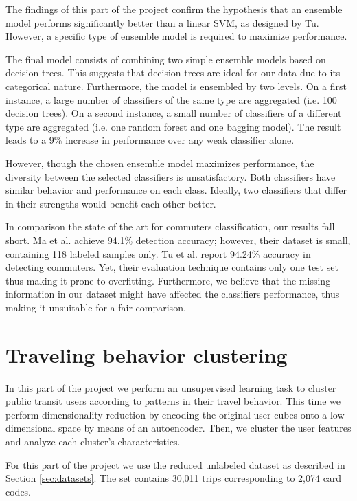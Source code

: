 \documentclass{article}
\begin{document}
The findings of this part of the project confirm the hypothesis that an ensemble model performs significantly better than a linear SVM, as designed by Tu. However, a specific type of ensemble model is required to maximize performance. 

The final model consists of combining two simple ensemble models based on decision trees. This suggests that decision trees are ideal for our data due to its categorical nature. Furthermore, the model is ensembled by two levels. On a first instance, a large number of classifiers of the same type are aggregated (i.e. 100 decision trees). On a second instance, a small number of classifiers of a different type are aggregated (i.e. one random forest and one bagging model). The result leads to a 9\% increase in performance over any weak classifier alone.  

However, though the chosen ensemble model maximizes performance, the diversity between the selected classifiers is unsatisfactory. Both classifiers have similar behavior and performance on each class. Ideally, two classifiers that differ in their strengths would benefit each other better. 


In comparison the state of the art for commuters classification, our results fall short. Ma et al. \cite{ma2017understanding} achieve 94.1\% detection accuracy; however, their dataset is small, containing 118 labeled samples only. Tu et al. \cite{tu2016impact} report 94.24\% accuracy in detecting commuters. Yet, their evaluation technique contains only one test set thus making it prone to overfitting. Furthermore, we believe that the missing information in our dataset might have affected the classifiers performance, thus making it unsuitable for a fair comparison.

\newpage
\section{Traveling behavior clustering}
\label{sec:partIII}
In this part of the project we perform an unsupervised learning task to cluster public transit users according to patterns in their travel behavior. This time we perform dimensionality reduction by encoding the original user cubes onto a low dimensional space by means of an autoencoder. Then, we cluster the user features and analyze each cluster's characteristics. 

For this part of the project we use the reduced unlabeled dataset as described in Section \ref{sec:datasets}. The set contains 30,011 trips corresponding to 2,074 card codes. 
\end{document}
